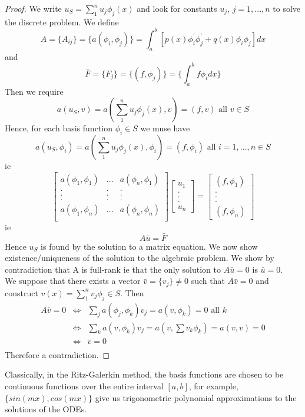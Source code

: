 \begin{proof}
We write $u_S=\sum_{1}^{n}u_j\phi_j(x)$ and look for constants $u_j$, $j=1,...,n$
to solve the discrete problem. We define
\[A=\{A_{ij} \}=\{a(\phi_i,\phi_j)\}=\int_a^b[p(x)\phi_i^{'}\phi_j^{'}+q(x)\phi_i\phi_j ]dx \]
and 
\[\bar{F}=\{F_{j} \}=\{(f,\phi_j)\}=\{\int_a^bf\phi_i dx \} \]
Then we require
\[a(u_S,v)=a(\sum_{1}^{n}u_j\phi_j(x),v)=(f,v) \mbox{ all } v \in S \]
Hence, for each basis function $\phi_i\in S$ we muse have
\[a(u_S,\phi_i)=a(\sum_{1}^{n}u_j\phi_j(x),\phi_i)=(f,\phi_i) \mbox{ all } i=1,...,n \in S \]
ie
\[\left[\begin{array}{ccc}
a(\phi_1,\phi_1)&...&a(\phi_n,\phi_1)\\
.&.&.\\
.&.&.\\
.&.&.\\
a(\phi_1,\phi_n)&...&a(\phi_n,\phi_n)\\
 \end{array} \right]
 \left[\begin{array}{c} u_1\\ .\\ .\\ .\\ u_n \end{array}
 \right]
=
 \left[\begin{array}{c} (f,\phi_1)\\ .\\ .\\ .\\ (f,\phi_n) \end{array}
 \right]
\]
ie
\[ A \bar{u}=\bar{F} \]
Hence $u_S$ is found by the solution to a matrix equation. We now show existence/uniqueness
of the solution to the algebraic problem.  We show by contradiction that A is full-rank
ie that the only solution to $A\bar{u}=0$ is $\bar{u}=0$.\\
We suppose that there exists a vector $\bar{v}=\{v_j\}\not=0$ such that $A\bar{v}=0$
and construct $v(x)=\sum_{1}^nv_j\phi_j \in S$. Then
\[\begin{array}{ccl}
A\bar{v}=0&\Leftrightarrow&\sum_j a(\phi_j,\phi_k)v_j=a(v,\phi_k)=0 \mbox{ all } k \\
&\Leftrightarrow&\sum_k a(v,\phi_k)v_j=a(v,\sum v_k\phi_k)=a(v,v)=0 \\
&\Leftrightarrow& v=0 \\
\end{array}
 \]
Therefore a contradiction.
\end{proof}
Classically, in the Ritz-Galerkin method, the basis functions are chosen to be continuous functions over the entire interval $[a,b]$, for example, $\{ sin (mx), cos (mx) \}$
give us trigonometric polynomial approximations to the solutions of the ODEs.
